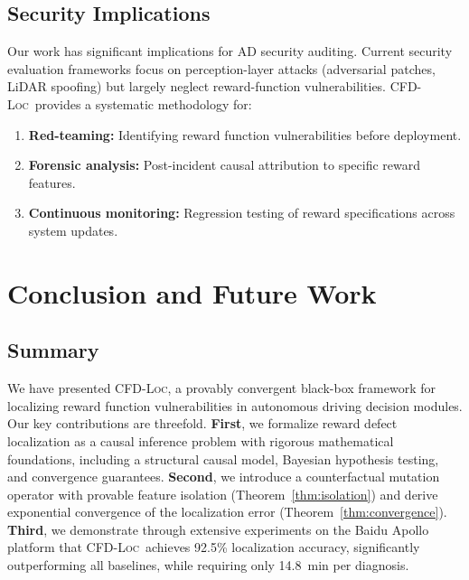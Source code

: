 \documentclass[journal]{IEEEtran}
\theoremstyle{plain}
\theoremstyle{definition}
\theoremstyle{remark}
\newcommand{\methodname}{\textsc{CFD-Loc}}
\begin{document}
\subsection{Security Implications}

Our work has significant implications for AD security auditing. Current security evaluation frameworks focus on perception-layer attacks (adversarial patches, LiDAR spoofing) but largely neglect reward-function vulnerabilities. \methodname\ provides a systematic methodology for:
\begin{enumerate}[nosep]
    \item \textbf{Red-teaming:} Identifying reward function vulnerabilities before deployment.
    \item \textbf{Forensic analysis:} Post-incident causal attribution to specific reward features.
    \item \textbf{Continuous monitoring:} Regression testing of reward specifications across system updates.
\end{enumerate}

\section{Conclusion and Future Work}
\label{sec:conclusion}

\subsection{Summary}

We have presented \methodname, a provably convergent black-box framework for localizing reward function vulnerabilities in autonomous driving decision modules. Our key contributions are threefold. \textbf{First}, we formalize reward defect localization as a causal inference problem with rigorous mathematical foundations, including a structural causal model, Bayesian hypothesis testing, and convergence guarantees. \textbf{Second}, we introduce a counterfactual mutation operator with provable feature isolation (Theorem~\ref{thm:isolation}) and derive exponential convergence of the localization error (Theorem~\ref{thm:convergence}). \textbf{Third}, we demonstrate through extensive experiments on the Baidu Apollo platform that \methodname\ achieves 92.5\% localization accuracy, significantly outperforming all baselines, while requiring only 14.8~min per diagnosis.
\end{document}
